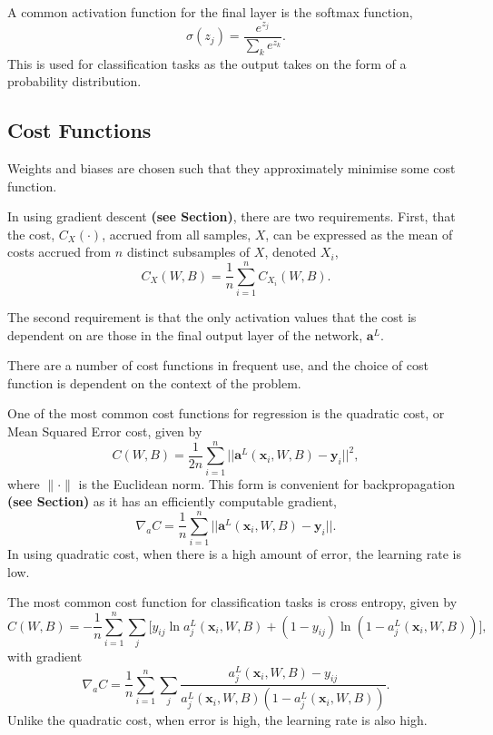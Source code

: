 A common activation function for the final layer is the softmax function,
\[
	\sigma(z_j) = \dfrac{e^{z_j}}{\sum_ke^{z_k}}.
\]
This is used for classification tasks as the output takes on the form of a probability distribution.

\subsection{Cost Functions}\label{nnets-cost}

Weights and biases are chosen such that they approximately minimise some cost function.

In using gradient descent \textbf{(see Section)}, there are two requirements. First, that the cost, $C_X(\cdot)$, accrued from all samples, $X$, can be expressed as the mean of costs accrued from $n$ distinct subsamples of $X$, denoted $X_i$,
\[
	C_X(W, B) = \dfrac{1}{n}\sum_{i=1}^n C_{X_i}(W,B).
\]

The second requirement is that the only activation values that the cost is dependent on are those in the final output layer of the network, $\mathbf{a}^L$.

There are a number of cost functions in frequent use, and the choice of cost function is dependent on the context of the problem.

One of the most common cost functions for regression is the quadratic cost, or Mean Squared Error cost, given by
\[
	C(W,B) = \dfrac{1}{2n}\sum_{i=1}^n||\mathbf{a}^L(\mathbf{x}_i,W,B) - \mathbf{y}_i ||^2,
\]
where $\|\cdot\|$ is the Euclidean norm. This form is convenient for backpropagation \textbf{(see Section)} as it has an efficiently computable gradient,
\[
	\nabla_aC = \dfrac{1}{n}\sum_{i=1}^n||\mathbf{a}^L(\mathbf{x}_i,W,B) - \mathbf{y}_i ||.
\]
In using quadratic cost, when there is a high amount of error, the learning rate is low.

The most common cost function for classification tasks is cross entropy, given by
\[
	C(W,B) = -\dfrac{1}{n}\sum_{i=1}^n\sum_j\big[y_{ij}\ln a_j^L(\mathbf{x}_i,W,B) + (1 - y_{ij})\ln (1 - a_j^L(\mathbf{x}_i,W,B))\big],
\]
with gradient
\[
	\nabla_aC = \dfrac{1}{n}\sum_{i=1}^n\sum_j\dfrac{a_j^L(\mathbf{x}_i,W,B) - y_{ij}}{a_j^L(\mathbf{x}_i,W,B)(1-a_j^L(\mathbf{x}_i,W,B))}.
\]
Unlike the quadratic cost, when error is high, the learning rate is also high.


